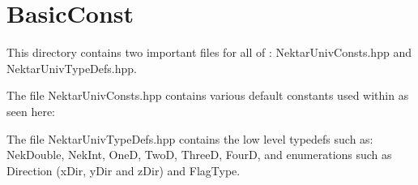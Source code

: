 %
\section{BasicConst}

This directory contains two important files for all of {\nek}:  NektarUnivConsts.hpp and NektarUnivTypeDefs.hpp.

The file NektarUnivConsts.hpp contains various default constants used within {\nek} as seen here:



The file NektarUnivTypeDefs.hpp contains the low level typedefs such as:  NekDouble, NekInt, OneD, TwoD, ThreeD, FourD, and
enumerations such as Direction (xDir, yDir and zDir) and FlagType. 
